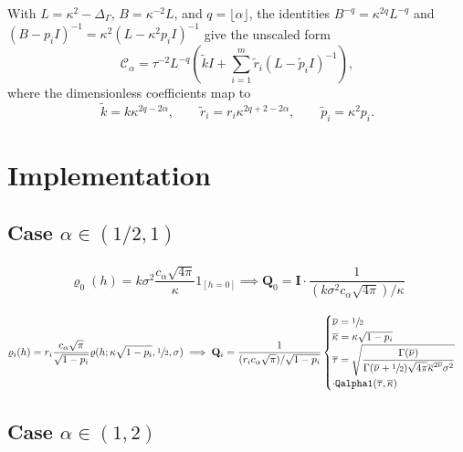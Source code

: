 \documentclass[11pt,a4paper]{article}
\theoremstyle{plain}
\theoremstyle{definition}
\begin{document}
With $L=\kappa^2-\Delta_\Gamma$, $B=\kappa^{-2}L$, and
$q=\lfloor\alpha\rfloor$, the identities
$B^{-q}=\kappa^{2q}L^{-q}$ and
$(B-p_iI)^{-1}=\kappa^2(L-\kappa^2p_iI)^{-1}$ give the unscaled form
\begin{equation}
\mathcal C_\alpha
=\tau^{-2}L^{-q}\left(\widetilde kI
 +\sum_{i=1}^m\widetilde r_i(L-\widetilde p_iI)^{-1}\right),
\label{eq:comparison_cov_operator}
\end{equation}
where the dimensionless coefficients map to
\begin{equation}
\widetilde k=k\kappa^{2q-2\alpha},\qquad
\widetilde r_i=r_i\kappa^{2q+2-2\alpha},\qquad
\widetilde p_i=\kappa^2p_i.
\end{equation}


\section{Implementation}

\subsection{Case $\alpha\in(1/2,1)$}

\begin{align}
    \varrho_0(h) = k\sigma^2\dfrac{c_\alpha\sqrt{4\pi}}{\kappa}1_{[h=0]}\implies \mathbf{Q}_0 = \mathbf{I}\cdot \dfrac{1}{(k\sigma^2c_\alpha\sqrt{4\pi})/\kappa}
\end{align}

\begin{align}
    \varrho_i(h) = r_i \dfrac{c_\alpha\sqrt{\pi}}{\sqrt{1-p_i}}\varrho(h;\kappa\sqrt{1-p_i}, \sfrac{1}{2}, \sigma) \implies \mathbf{Q}_i = \dfrac{1}{(r_i c_\alpha\sqrt{\pi})/\sqrt{1-p_i}}\begin{cases}
        \overline{\nu} = \sfrac{1}{2}\\
        \overline{\kappa} = \kappa\sqrt{1-p_i}\\
        \overline{\tau} =  \sqrt{\dfrac{\Gamma(\overline{\nu})}{\Gamma(\overline{\nu}+\sfrac{1}{2})\sqrt{4\pi}\overline{\kappa}^{2\overline{\nu}}\sigma^2}}\\
        \cdot\texttt{Qalpha1}(\overline{\tau}, \overline{\kappa})
    \end{cases}
\end{align}
\subsection{Case $\alpha\in(1,2)$}
\end{document}
